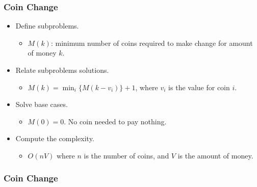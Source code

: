 \documentclass{beamer}
\begin{document}
\begin{frame}%
\frametitle{Coin Change}

\begin{itemize}

\item Define subproblems.
\begin{itemize}
\item $M(k)$: minimum number of coins required to make change for amount of money $k$.
\end{itemize}

\vspace{0.4cm}

\item<2-> Relate subproblems solutions.
\begin{itemize}
\item<2-> $M(k) = \min_i \{ M(k - v_i) \} + 1$, where $v_i$ is the value for coin $i$.
\end{itemize}

\vspace{0.4cm}

\item<3-> Solve base cases.
\begin{itemize}
\item<3-> $M(0) = 0$. No coin needed to pay nothing.
\end{itemize}

\vspace{0.4cm}

\item<4-> Compute the complexity.
\begin{itemize}
\item<4> $O(nV)$ where $n$ is the number of coins, and $V$ is the amount of money.
\end{itemize}

\end{itemize}

\end{frame}

\begin{frame}%
\frametitle{Coin Change}


\end{frame}
\end{document}
